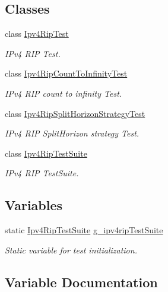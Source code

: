 \subsection*{Classes}
\begin{DoxyCompactItemize}
\item 
class \hyperlink{classIpv4RipTest}{Ipv4\+Rip\+Test}
\begin{DoxyCompactList}\small\item\em I\+Pv4 R\+IP Test. \end{DoxyCompactList}\item 
class \hyperlink{classIpv4RipCountToInfinityTest}{Ipv4\+Rip\+Count\+To\+Infinity\+Test}
\begin{DoxyCompactList}\small\item\em I\+Pv4 R\+IP count to infinity Test. \end{DoxyCompactList}\item 
class \hyperlink{classIpv4RipSplitHorizonStrategyTest}{Ipv4\+Rip\+Split\+Horizon\+Strategy\+Test}
\begin{DoxyCompactList}\small\item\em I\+Pv4 R\+IP Split\+Horizon strategy Test. \end{DoxyCompactList}\item 
class \hyperlink{classIpv4RipTestSuite}{Ipv4\+Rip\+Test\+Suite}
\begin{DoxyCompactList}\small\item\em I\+Pv4 R\+IP Test\+Suite. \end{DoxyCompactList}\end{DoxyCompactItemize}
\subsection*{Variables}
\begin{DoxyCompactItemize}
\item 
static \hyperlink{classIpv4RipTestSuite}{Ipv4\+Rip\+Test\+Suite} \hyperlink{ipv4-rip-test_8cc_a4a07a8dab9563f25a1f28c17cf630dbc}{g\+\_\+ipv4rip\+Test\+Suite}
\begin{DoxyCompactList}\small\item\em Static variable for test initialization. \end{DoxyCompactList}\end{DoxyCompactItemize}


\subsection{Variable Documentation}

